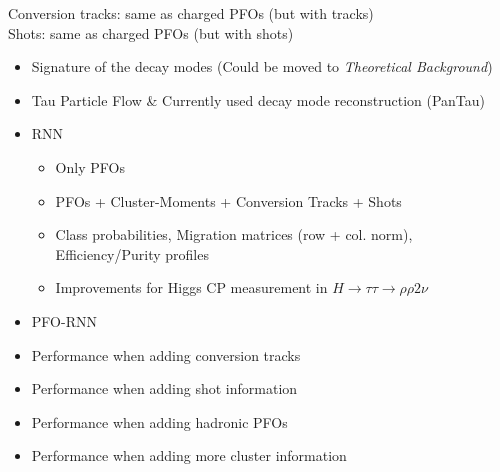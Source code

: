 Conversion tracks: same as charged PFOs (but with tracks) \\
Shots: same as charged PFOs (but with shots) \\



\begin{itemize}
\item Signature of the decay modes (Could be moved to \textit{Theoretical
    Background})
\item Tau Particle Flow \& Currently used decay mode reconstruction (PanTau)
\item RNN
  \begin{itemize}
  \item Only PFOs
  \item PFOs + Cluster-Moments + Conversion Tracks + Shots
  \item Class probabilities, Migration matrices (row + col. norm),
    Efficiency/Purity profiles
  \item Improvements for Higgs CP measurement in
    $H \rightarrow \tau\tau \rightarrow \rho \rho 2\nu$
  \end{itemize}
\end{itemize}

\begin{itemize}
\item PFO-RNN

\item Performance when adding conversion tracks

\item Performance when adding shot information

\item Performance when adding hadronic PFOs

\item Performance when adding more cluster information

\end{itemize}

